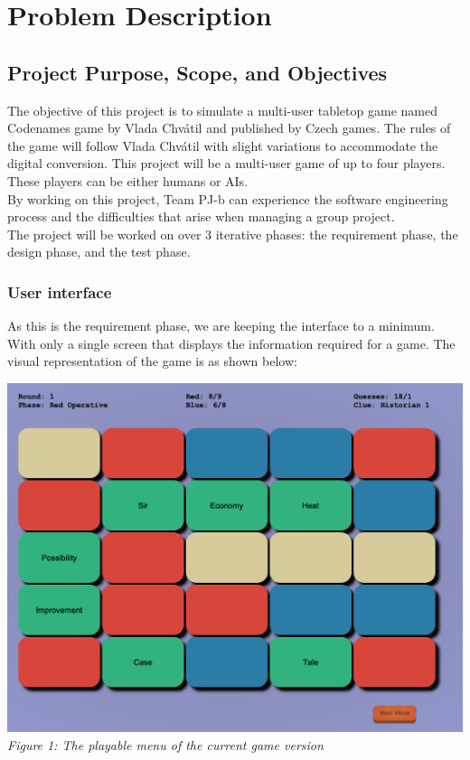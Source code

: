 \documentclass[10pt, a4paper]{article}
\begin{document}
	\clearpage
	
\section{Problem Description}

	\subsection{Project Purpose, Scope, and Objectives}
	
	The objective of this project is to simulate a multi-user tabletop game named Codenames game by Vlada Chv\'atil and published by Czech games. The rules of the game will follow Vlada Chv\'atil with slight variations to accommodate the digital conversion. This project will be a multi-user game of up to four players. These players can be either humans or AIs.\\
	
	By working on this project, Team PJ-b can experience the software engineering process and the difficulties that arise when managing a group project.\\
	
	The project will be worked on over 3 iterative phases: the requirement phase, the design phase, and the test phase.
	
		\subsubsection{User interface}
		
		As this is the requirement phase, we are keeping the interface to a minimum. With only a single screen that displays the information required for a game. The visual representation of the game is as shown below:\\
		
		\begin{center}
			\includegraphics[scale=0.37]{Images/01_game_interface.png}
			\textit{\\Figure 1: The playable menu of the current game version}			
		\end{center}
	
\end{document}
